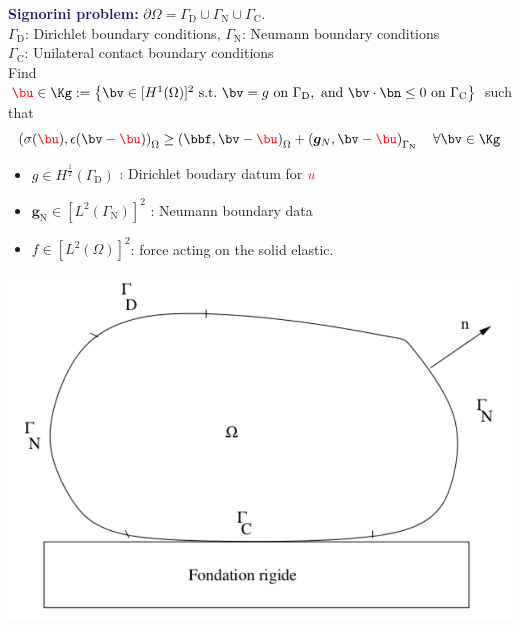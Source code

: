 \begin{frame}
  \textcolor{midnightblue}{\textbf{Signorini problem:}}
  $\partial \Omega = \Gamma_{\mathrm{D}} \cup \Gamma_{\mathrm{N}} \cup \Gamma_{\mathrm{C}}$. \\
  $\Gamma_{\mathrm{D}}$: Dirichlet boundary conditions, $\Gamma_{\mathrm{N}}$: Neumann boundary conditions \\
  $\Gamma_{\mathrm{C}}$: Unilateral contact boundary conditions
  \\
  \vspace*{0.1 cm}
  Find $\textcolor{red}{\bu} \in \Kg := \left\{ \bv \in [H^1(\Omega)]^2 \ \text{s.t.} \ \bv=g \ \text{on} \ \Gamma_{\mathrm{D}}, \ \text{and} \ \bv\cdot \bn \leq 0 \ \text{on} \ \Gamma_{\mathrm{C}} \right\}$ such that
\begin{equation*}
\left( \sigma (\textcolor{red}{\bu}), \epsilon (\bv-\textcolor{red}{\bu}) \right)_{\Omega} \geq \left(\bbf,\bv-\textcolor{red}{\bu}\right)_{\Omega} + \left({\bm g}_{N}, \bv-\textcolor{red}{\bu} \right)_{\Gamma_{\mathrm{N}}}\quad \forall \bv \in \Kg
\end{equation*}

\begin{minipage}{0.55 \linewidth}
\begin{itemize}
\item $g \in H^{\frac{1}{2}}(\Gamma_{\mathrm{D}})$ : Dirichlet boudary datum for $\textcolor{red}{u}$
  \item  ${\bm g}_{\mathrm{N}} \in [L^2(\Gamma_{\mathrm{N}})]^2$ :  Neumann boundary data
  \item  $f \in [L^2(\Omega)]^2$: force acting on the solid elastic.
\end{itemize}
\end{minipage}
\hfill
\begin{minipage}{0.42 \linewidth}
\includegraphics[scale=0.4]{image_signorini}
\end{minipage}
\end{frame}
